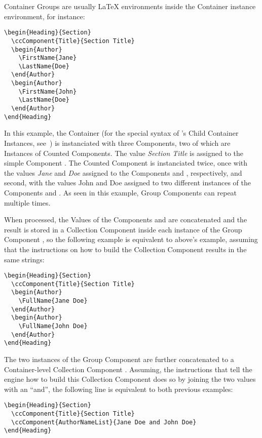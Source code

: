 Container Groups are usually LaTeX environments inside the Container
instance environment, for instance:
\begin{lstlisting}[style=tex]
\begin{Heading}{Section}
  \ccComponent{Title}{Section Title}
  \begin{Author}
    \FirstName{Jane}
    \LastName{Doe}
  \end{Author}
  \begin{Author}
    \FirstName{John}
    \LastName{Doe}
  \end{Author}
\end{Heading}
\end{lstlisting}
In this example, the Container  (for the
special syntax of 's Child Container
Instances, see~) is instanciated with three
Components, two of which are Instances of Counted Components. The
value \textit{Section Title} is assigned to the simple Component
.  The Counted Component
 is instanciated twice, once with the values
\textit{Jane} and \textit{Doe} assigned to the Components
 and ,
respectively, and second, with the values John and Doe assigned to two
different instances of the Components  and
. As seen in this example, Group Components
can repeat multiple times.

When processed, the Values of the Components
 and  are
concatenated and the result is stored in a Collection Component
 inside each instance of the Group Component
, so the following example is equivalent to
above's example, assuming that the instructions on how to build the
Collection Component  results in the same
strings:
\begin{lstlisting}[style=tex]
\begin{Heading}{Section}
  \ccComponent{Title}{Section Title}
  \begin{Author}
    \FullName{Jane Doe}
  \end{Author}
  \begin{Author}
    \FullName{John Doe}
  \end{Author}
\end{Heading}
\end{lstlisting}
The two instances of the Group Component  are
further concatenated to a Container-level Collection Component
. Assuming, the instructions that tell
the engine how to build this Collection Component does so by joining
the two  values with an “and”, the following
line is equivalent to both previous examples:
\begin{lstlisting}[style=tex]
\begin{Heading}{Section}
  \ccComponent{Title}{Section Title}
  \ccComponent{AuthorNameList}{Jane Doe and John Doe}
\end{Heading}
\end{lstlisting}



